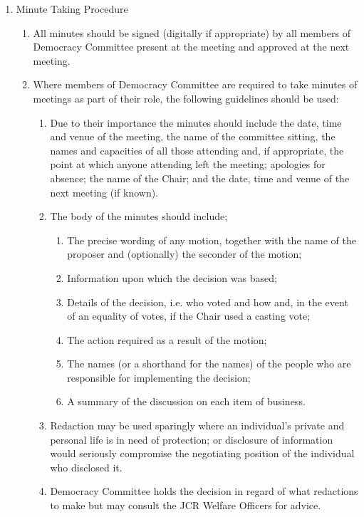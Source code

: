 \begin{enumerate}
    \item Minute Taking Procedure
    \begin{enumerate}
        \item All minutes should be signed (digitally if appropriate) by all members of Democracy Committee present at the meeting and approved at the next meeting.
        \item Where members of Democracy Committee are required to take minutes of meetings as part of their role, the following guidelines should be used:
        \begin{enumerate}
            \item Due to their importance the minutes should include the date, time and venue of the meeting, the name of the committee sitting, the names and capacities of all those attending and, if appropriate, the point at which anyone attending left the meeting; apologies for absence; the name of the Chair; and the date, time and venue of the next meeting (if known).
            \item The body of the minutes should include;
            \begin{enumerate}
                \item  The precise wording of any motion, together with the name of the proposer
                and (optionally) the seconder of the motion;
                \item Information upon which the decision was based;
                \item Details of the decision, i.e. who voted and how and, in the event of an equality of votes, if the Chair used a casting vote;
                \item The action required as a result of the motion;
                \item The names (or a shorthand for the names) of the people who are responsible
                for implementing the decision;
                \item A summary of the discussion on each item of business.
            \end{enumerate}
            \item Redaction may be used sparingly where an individual’s private and personal life is in need of protection; or disclosure of information would seriously compromise the negotiating position of the individual who disclosed it.
            \item Democracy Committee holds the decision in regard of what redactions to make but may consult the JCR Welfare Officers for advice.

\end{enumerate}
\end{enumerate}
\end{enumerate}

